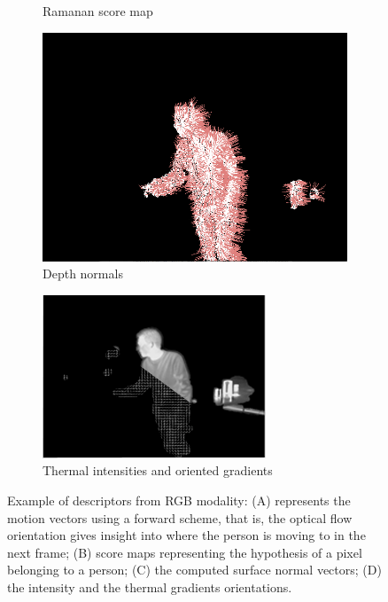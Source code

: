 \documentclass[10pt,twocolumn,letterpaper]{article}
\begin{document}
\begin{figure}
\begin{subfigure}[b]{0.5\textwidth}
                \caption{Ramanan score map}
                \label{fig:ramanan}
        \end{subfigure}
        \begin{subfigure}[b]{0.5\textwidth}
                \includegraphics[width=\textwidth]{normals.png}
                \caption{Depth normals}
                \label{fig:normals}
        \end{subfigure}
        \begin{subfigure}[b]{0.5\textwidth}
                \includegraphics[width=\textwidth]{hihog.png}
                \caption{Thermal intensities and oriented gradients}
                \label{fig:thermals}
        \end{subfigure}	
        \caption{Example of descriptors from RGB modality: (A) represents the motion vectors using a forward scheme, that is, the optical flow orientation gives insight into where the person is moving to in the next frame; (B) score maps representing the hypothesis of a pixel belonging to a person; (C) the computed surface normal vectors; (D) the intensity and the thermal gradients orientations. }\label{fig:descriptors}
\end{figure}
\end{document}
